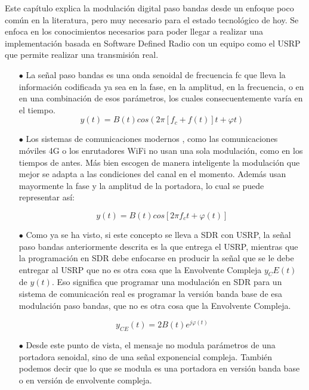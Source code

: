 Este capítulo explica la modulación digital paso bandas desde un enfoque poco común en la literatura, pero muy necesario para el estado tecnológico de hoy. Se enfoca en los conocimientos necesarios para poder llegar a realizar una implementación basada en Software Defined Radio con un equipo como el USRP que permite realizar una transmisión real. \\
\begin{itemize}
	\item [$\bullet$] La señal paso bandas es una onda senoidal de frecuencia fc que lleva la información codificada ya sea en la fase, en la amplitud, en la frecuencia, o en en una combinación de esos parámetros, los cuales consecuentemente varía en el tiempo. 
	 \begin{equation} \label{capcuatro_uno}
	 	 y(t) = B(t)cos(2 \pi [f_c+f(t)]t+ \varphi t)
     \end{equation}
	
	\item [$\bullet$] Los sistemas de comunicaciones modernos , como las comunicaciones móviles 4G o los enrutadores WiFi no usan una sola modulación, como en los tiempos de antes. Más bien escogen de manera inteligente la modulación que mejor se adapta a las condiciones del canal en el momento. Además usan mayormente la fase y la amplitud de la portadora, lo cual se puede representar así:

 \begin{equation} \label{capcuatro_dos}
	  y(t)=B(t)cos[2 \pi f_ct + \varphi(t)] 
 \end{equation}

	
	\item [$\bullet$] Como ya se ha visto, si este concepto se lleva a SDR con USRP, la señal paso bandas anteriormente descrita es la que entrega el USRP, mientras que la programación en SDR debe enfocarse en producir la señal que se le debe entregar al USRP que no es otra cosa que la Envolvente Compleja $y_CE(t)$ de $y(t)$. Eso significa que programar una modulación en SDR para un sistema de comunicación real es programar la versión banda base de esa modulación paso bandas, que no es otra cosa que la Envolvente Compleja. 

 \begin{equation} \label{capcuatro_tres}
	 y_{CE}(t)=2B(t)e^{j\varphi(t)}
 \end{equation}

	\item [$\bullet$] Desde este punto de vista, el mensaje no modula parámetros de una portadora senoidal, sino de una señal exponencial compleja. También podemos decir que lo que se modula es una portadora en versión banda base o en versión de envolvente compleja.
	

\end{itemize}
